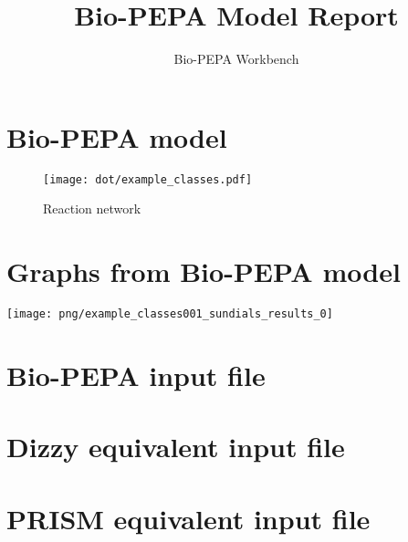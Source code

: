 \documentclass{llncs}
\title{Bio-PEPA Model Report}
\author{Bio-PEPA Workbench}
\institute{\today}
\begin{document}
\maketitle
\section{Bio-PEPA model}

\begin{figure}[htbp]
\begin{center}
\texttt{[image: dot/example\_classes.pdf]}
\caption{Reaction network}
\end{center}
\end{figure}
\newpage
\section{Graphs from Bio-PEPA model}
\texttt{[image: png/example\_classes001\_sundials\_results\_0]}
\appendix
\newpage
\section{Bio-PEPA input file}

\newpage
\section{Dizzy equivalent input file}

\newpage
\section{PRISM equivalent input file}

\end{document}

